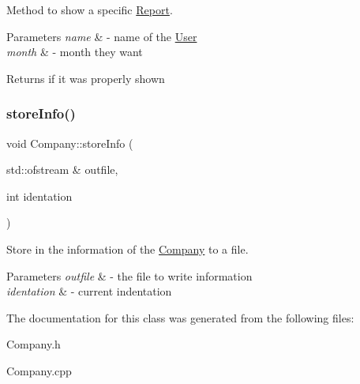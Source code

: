 Method to show a specific \mbox{\hyperlink{class_report}{Report}}. 


\begin{DoxyParams}{Parameters}
{\em name} & -\/ name of the \mbox{\hyperlink{class_user}{User}} \\
\hline
{\em month} & -\/ month they want \\
\hline
\end{DoxyParams}
\begin{DoxyReturn}{Returns}
if it was properly shown 
\end{DoxyReturn}
\mbox{\label{class_company_ac03f62f1accf21eb445a7aa5731b1199}} 
\subsubsection{\texorpdfstring{store\+Info()}{storeInfo()}}
{\footnotesize\ttfamily void Company\+::store\+Info (\begin{DoxyParamCaption}\item[{std\+::ofstream \&}]{outfile,  }\item[{int}]{identation }\end{DoxyParamCaption})}



Store in the information of the \mbox{\hyperlink{class_company}{Company}} to a file. 


\begin{DoxyParams}{Parameters}
{\em outfile} & -\/ the file to write information \\
\hline
{\em identation} & -\/ current indentation \\
\hline
\end{DoxyParams}


The documentation for this class was generated from the following files\+:\begin{DoxyCompactItemize}
\item 
Company.\+h\item 
Company.\+cpp\end{DoxyCompactItemize}
